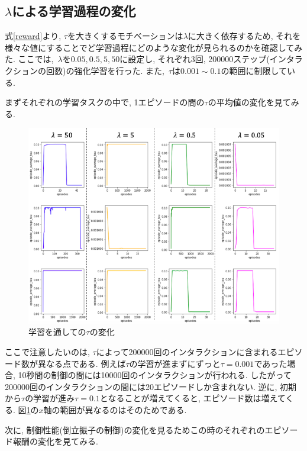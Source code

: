 \documentclass{jsarticle}
\begin{document}
\subsection{$\lambda$による学習過程の変化}
式\eqref{reward}より, $\tau$を大きくするモチベーションは$\lambda$に大きく依存するため, それを様々な値にすることでど学習過程にどのような変化が見られるのかを確認してみた. ここでは,~$\lambda$を$0.05, 0.5, 5, 50$に設定し, それぞれ3回, 200000ステップ(インタラクションの回数)の強化学習を行った. また,~$\tau$は$0.001\sim0.1$の範囲に制限している.\par
まずそれぞれの学習タスクの中で, 1エピソードの間の$\tau$の平均値の変化を見てみる.\par
\begin{figure}[h]
	\centering
 	\includegraphics[width=14cm]{tau_exp_ave.png}
 	\caption{学習を通しての$\tau$の変化} \label{average_tau}
\end{figure}
ここで注意したいのは, $\tau$によって200000回のインタラクションに含まれるエピソード数が異なる点である. 例えば$\tau$の学習が進まずにずっと$\tau=0.001$であった場合, 10秒間の制御の間には10000回のインタラクションが行われる. したがって200000回のインタラクションの間には20エピソードしか含まれない. 逆に, 初期から$\tau$の学習が進み$\tau=0.1$となることが増えてくると, エピソード数は増えてくる. 図\ref{average_tau}の$x$軸の範囲が異なるのはそのためである. \par
次に, 制御性能(倒立振子の制御)の変化を見るためこの時のそれぞれのエピソード報酬の変化を見てみる. 
\end{document}
